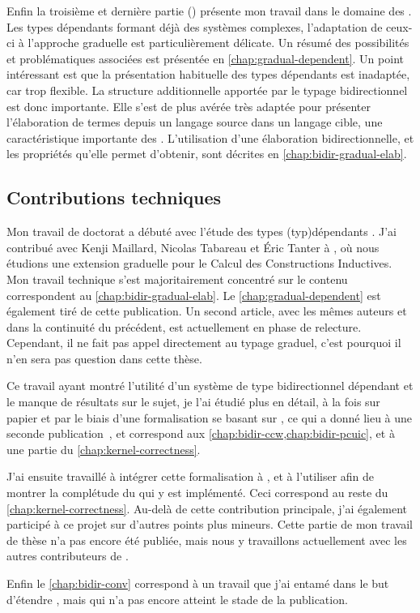 Enfin la troisième et dernière partie ()
présente mon travail dans le domaine des .
Les types dépendants formant déjà des systèmes
complexes, l’adaptation de ceux-ci à l’approche graduelle est particulièrement
délicate. Un résumé des possibilités et problématiques associées est présentée
en \cref{chap:gradual-dependent}.
Un point intéressant est que la présentation habituelle
des types dépendants est inadaptée, car trop flexible.
La structure additionnelle apportée par le typage bidirectionnel est donc importante.
Elle s’est de plus avérée très adaptée pour présenter
l’élaboration de termes depuis un langage source dans un langage cible, une
caractéristique importante des .
L’utilisation d’une élaboration bidirectionnelle, et les propriétés qu’elle
permet d’obtenir, sont décrites en \cref{chap:bidir-gradual-elab}.

\subsection{Contributions techniques}

Mon travail de doctorat a débuté avec l’étude des types \kl(typ){dépendants} .
J’ai contribué avec Kenji Maillard, Nicolas Tabareau et Éric Tanter à
, où nous étudions une extension graduelle
pour le Calcul des Constructions Inductives. Mon travail technique s’est
majoritairement concentré sur le contenu correspondent au \cref{chap:bidir-gradual-elab}.
Le \cref{chap:gradual-dependent} est également tiré de cette publication.
Un second article, avec les mêmes auteurs et dans la continuité du précédent,
est actuellement en phase de relecture. Cependant, il
ne fait pas appel directement au typage graduel, c’est pourquoi il n’en
sera pas question dans cette thèse.

Ce travail ayant montré l’utilité d’un système de type bidirectionnel dépendant
et le manque de résultats sur le sujet, je l’ai
étudié plus en détail, à la fois sur papier et par le biais d’une
formalisation se basant sur ,
ce qui a donné lieu à une seconde publication~,
et correspond aux \cref{chap:bidir-ccw,chap:bidir-pcuic}, et à une partie du
\cref{chap:kernel-correctness}.

J’ai ensuite travaillé à intégrer cette formalisation à
, et à l’utiliser afin de montrer la complétude du 
qui y est implémenté. Ceci correspond au reste du \cref{chap:kernel-correctness}.
Au-delà de cette contribution principale,
j’ai également participé à ce projet sur d’autres points plus mineurs.
Cette partie de mon travail de thèse n’a pas encore été publiée, mais nous y
travaillons actuellement avec les autres contributeurs de .

Enfin le \cref{chap:bidir-conv} correspond à un travail que j’ai entamé dans
le but d’étendre , mais qui n’a pas encore atteint le stade de la
publication.